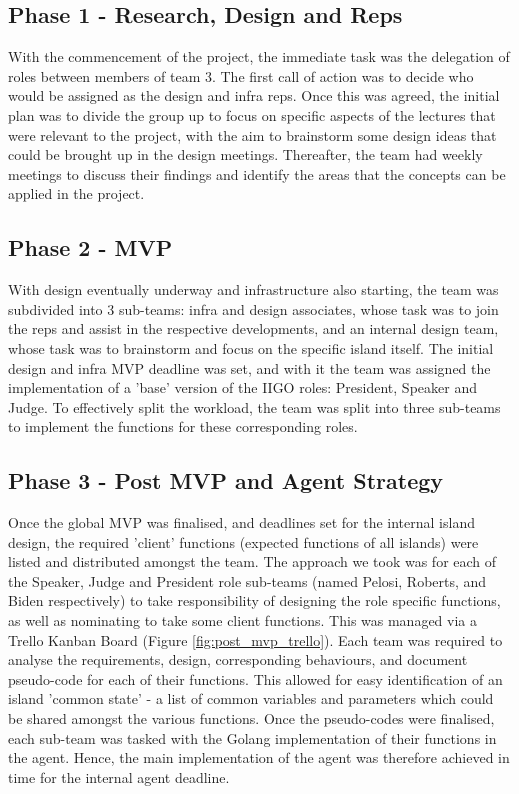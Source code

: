 \documentclass{article}
\begin{document}
\subsection{Phase 1 - Research, Design and Reps }
With the commencement of the project, the immediate task was the delegation of roles between members of team 3. The first call of action was to decide who would be assigned as the design and infra reps. Once this was agreed, the initial plan was to divide the group up to focus on specific aspects of the lectures that were relevant to the project, with the aim to brainstorm some design ideas that could be brought up in the design meetings. Thereafter, the team had weekly meetings to discuss their findings and identify the areas that the concepts can be applied in the project.
\subsection{Phase 2 - MVP}
With design eventually underway and infrastructure also starting, the team was subdivided into 3 sub-teams: infra and design associates, whose task was to join the reps and assist in the respective developments, and an internal design team, whose task was to brainstorm and focus on the specific island itself. The initial design and infra MVP deadline was set, and with it the team was assigned the implementation of a 'base' version of the IIGO roles: President, Speaker and Judge. To effectively split the workload, the team was split into three sub-teams to implement the functions for these corresponding roles.

\subsection{Phase 3 - Post MVP and Agent Strategy}
Once the global MVP was finalised, and deadlines set for the internal island design, the required 'client' functions (expected functions of all islands) were listed and distributed amongst the team. The approach we took was for each of the Speaker, Judge and President role sub-teams (named Pelosi, Roberts, and Biden respectively) to take responsibility of designing the role specific functions, as well as nominating to take some client functions. This was managed via a Trello Kanban Board (Figure \ref{fig:post_mvp_trello}). Each team was required to analyse the requirements, design, corresponding behaviours, and document pseudo-code for each of their functions. This allowed for easy identification of an island 'common state' - a list of common variables and parameters which could be shared amongst the various functions. Once the pseudo-codes were finalised, each sub-team was tasked with the Golang implementation of their functions in the agent. Hence, the main implementation of the agent was therefore achieved in time for the internal agent deadline.
\end{document}
